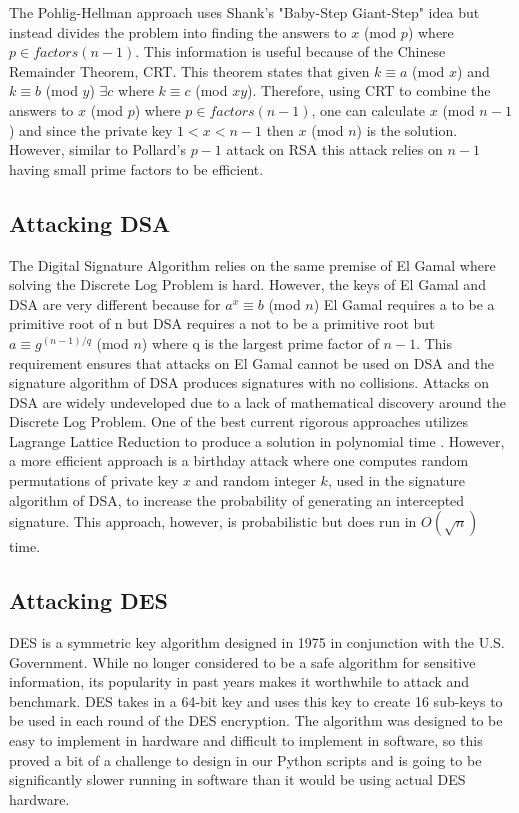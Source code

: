 \documentclass[12pt]{report}
\begin{document}
The Pohlig-Hellman approach uses Shank's "Baby-Step Giant-Step" idea but instead divides the problem into finding the answers to $x$ (mod $p$) where
$p \in factors(n-1)$. This information is useful because of the Chinese Remainder Theorem, CRT. This theorem states that given $k \equiv a$ (mod $x$) and
$k \equiv b$ (mod $y$) $\exists c$ where $k \equiv c$ (mod $xy$). Therefore, using CRT to combine the answers to $x$ (mod $p$) where $p \in factors(n-1)$, one can
calculate $x$ (mod $n-1$) and since the private key $1 < x < n-1$ then $x$ (mod $n$) is the solution. However, similar to Pollard's $p-1$ attack on RSA this attack
relies on $n-1$ having small prime factors to be efficient.

\subsection{Attacking DSA}
The Digital Signature Algorithm relies on the same premise of El Gamal where solving the Discrete Log Problem is hard. However, the keys of El Gamal and DSA are
very different because for $a^{x} \equiv b$ (mod $n$) El Gamal requires a to be a primitive root of n but DSA requires a not to be a primitive root but
$a \equiv g^{(n-1)/q}$ (mod $n$) where q is the largest prime factor of $n-1$. This requirement ensures that attacks on El Gamal cannot be used on DSA and the
signature algorithm of DSA produces signatures with no collisions. Attacks on DSA are widely undeveloped due to a lack of mathematical discovery around the Discrete
Log Problem. One of the best current rigorous approaches utilizes Lagrange Lattice Reduction to produce a solution in polynomial time \cite{lattice}. However, a
more efficient approach is a birthday attack where one computes random permutations of private key $x$ and random integer $k$, used in the signature algorithm of
DSA, to increase the probability of generating an intercepted signature. This approach, however, is probabilistic but does run in $O(\sqrt{n})$ time.

\subsection{Attacking DES}
DES is a symmetric key algorithm designed in 1975 in conjunction with the U.S. Government. While no longer considered to be a safe algorithm for sensitive
information, its popularity in past years makes it worthwhile to attack and benchmark. DES takes in a 64-bit key and uses this key to create 16 sub-keys to be used
in each round of the DES encryption. The algorithm was designed to be easy to implement in hardware and difficult to implement in software, so this proved a bit of
a challenge to design in our Python scripts and is going to be significantly slower running in software than it would be using actual DES hardware.
\end{document}
